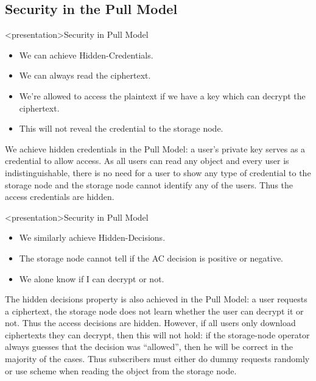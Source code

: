\subsection<article>{Security in the Pull Model}\label{PullModelSec}

\begin{frame}<presentation>{Security in Pull Model}
  \begin{itemize}

    \item We can achieve Hidden-Credentials.

    \item We can always read the ciphertext.

    \item We're allowed to access the plaintext if we have a key which can 
      decrypt the ciphertext.

    \item This will not reveal the credential to the storage node.

  \end{itemize}
\end{frame}

We achieve hidden credentials in the Pull Model: a user's private key serves as 
a credential to allow access.
As all users can read any object and every user is indistinguishable, there is 
no need for a user to show any type of credential to the storage node and the 
storage node cannot identify any of the users.
Thus the access credentials are hidden.

\begin{frame}<presentation>{Security in Pull Model}
  \begin{itemize}

    \item We similarly achieve Hidden-Decisions.

    \item The storage node cannot tell if the \ac{AC} decision is positive or 
      negative.

    \item We alone know if I can decrypt or not.

  \end{itemize}
\end{frame}

The hidden decisions property is also achieved in the Pull Model: a user 
requests a ciphertext, the storage node does not learn whether the user can 
decrypt it or not.
Thus the access decisions are hidden.
However, if all users only download ciphertexts they can decrypt, then this 
will not hold:
if the storage-node operator always guesses that the decision was 
\enquote{allowed}, then he will be correct in the majority of the cases.
Thus subscribers must either do dummy requests randomly or use  scheme 
when reading the object from the storage node.

